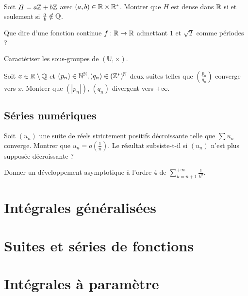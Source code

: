 \documentclass[12pt,a4paper]{exo_book}
\begin{document}
\begin{exo}
    Soit $H = a\mathbb{Z} + b\mathbb{Z}$ avec $(a,b) \in \mathbb{R}\times\mathbb{R}^*$. Montrer que $H$ est dense dans $\mathbb{R}$ si et seulement si $\frac{a}{b} \notin \mathbb{Q}$.
\end{exo}

\begin{exo}
    Que dire d'une fonction continue $f : \mathbb{R} \to \mathbb{R}$ admettant $1$ et $\sqrt{2}$ comme périodes ?
\end{exo}

\begin{exo}
    Caractériser les sous-groupes de $(\mathbb{U}, \times)$.
\end{exo}

\begin{exo}
    Soit $x \in \mathbb{R} \setminus \mathbb{Q}$ et $(p_n) \in \mathbb{N} ^ {\mathbb{N}}, (q_n) \in (\mathbb{Z}^*)^{\mathbb{N}}$ deux suites telles que $\left(\frac{p_n}{q_n}\right)$ converge vers $x$. Montrer que $(|p_n|)$, $(q_n)$ divergent vers $+\infty$.
\end{exo}

\section{Séries numériques}

\begin{exo}
    Soit $(u_n)$ une suite de réels strictement positifs décroissante telle que $\sum u_n$ converge. Montrer que $u_n = o\left(\frac{1}{n}\right)$. Le résultat subsiste-t-il si $(u_n)$ n'est plus supposée décroissante ?
\end{exo}

\begin{exo}
    Donner un développement asymptotique à l'ordre 4 de $\displaystyle \sum_{k=n+1}^{+\infty} \frac{1}{k^2}$.
\end{exo}

\chapter{Intégrales généralisées}

\chapter{Suites et séries de fonctions}

\chapter{Intégrales à paramètre}
\end{document}

